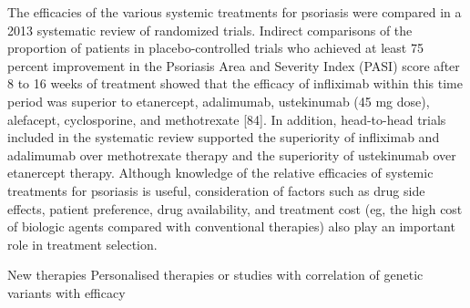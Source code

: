 The efficacies of the various systemic treatments for psoriasis were compared in a 2013 systematic review of randomized trials. Indirect comparisons of the proportion of patients in placebo-controlled trials who achieved at least 75 percent improvement in the Psoriasis Area and Severity Index (PASI) score after 8 to 16 weeks of treatment showed that the efficacy of infliximab within this time period was superior to etanercept, adalimumab, ustekinumab (45 mg dose), alefacept, cyclosporine, and methotrexate [84]. In addition, head-to-head trials included in the systematic review supported the superiority of infliximab and adalimumab over methotrexate therapy and the superiority of ustekinumab over etanercept therapy. Although knowledge of the relative efficacies of systemic treatments for psoriasis is useful, consideration of factors such as drug side effects, patient preference, drug availability, and treatment cost (eg, the high cost of biologic agents compared with conventional therapies) also play an important role in treatment selection.










New therapies
Personalised therapies or studies with correlation of genetic variants with efficacy









